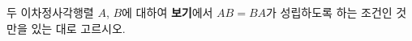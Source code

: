 \hspace*{2mm}\begin{minipage}[t]{\dimexpr\linewidth-2mm\relax}\vspace{0pt}
두 이차정사각행렬 $A$, $B$에 대하여 \textbf{보기}에서 $AB=BA$가 성립하도록 하는 조건인 것만을 있는 대로 고르시오.  \end{minipage}
